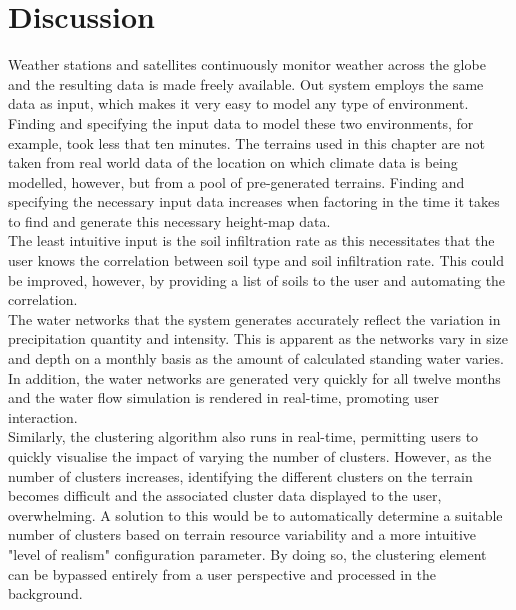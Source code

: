 \section{Discussion}

Weather stations and satellites continuously monitor weather across the globe and the resulting data is made freely available. Out system employs the same data as input, which makes it very easy to model any type of environment. Finding and specifying the input data to model these two environments, for example, took less that ten minutes. The terrains used in this chapter are not taken from real world data of the location on which climate data is being modelled, however, but from a pool of pre-generated terrains. Finding and specifying the necessary input data increases when factoring in the time it takes to find and generate this necessary height-map data.\\
The least intuitive input is the soil infiltration rate as this necessitates that the user knows the correlation between soil type and soil infiltration rate. This could be improved, however, by providing a list of soils to the user and automating the correlation.\\

The water networks that the system generates accurately reflect the variation in precipitation quantity and intensity. This is apparent as the networks vary in size and depth on a monthly basis as the amount of calculated standing water varies. In addition, the water networks are generated very quickly for all twelve months and the water flow simulation is rendered in real-time, promoting user interaction. \\

Similarly, the clustering algorithm also runs in real-time, permitting users to quickly visualise the impact of varying the number of clusters. However, as the number of clusters increases, identifying the different clusters on the terrain becomes difficult and the associated cluster data displayed to the user, overwhelming. A solution to this would be to automatically determine a suitable number of clusters based on terrain resource variability and a more intuitive "level of realism" configuration parameter. By doing so, the clustering element can be bypassed entirely from a user perspective and processed in the background.\\

